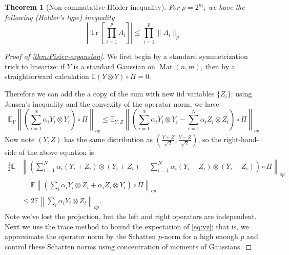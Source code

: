 \documentclass{article}
\newtheorem{theorem}{Theorem}
\newcommand{\ot}{\otimes}
\newcommand{\mat}{\operatorname{Mat}}
\newcommand{\E}{\mathbb{E}}
\newcommand\tr{\operatorname{Tr}}
\newcommand{\CF}[1]{{\color{purple}[CF: #1]}}
\begin{document}
\begin{theorem}[Non-commutative H\"older inequality]\label{thm:holder}
For $p = 2^{m}$, we have the following (Holder's type) inequality
\[ |\tr[\prod_{i=1}^{p} A_{i}]| \leq \prod_{i=1}^{p} \|A_{i}\|_{p}   \]
\end{theorem}



\begin{proof} [Proof of \cref{thm:Pisier-expansion}]
We first begin by a standard symmetrization trick to linearize: if $Y$ is a standard Gaussian on $\mat(n,m)$, then by a straightforward calculation $\E (Y \otimes Y)\circ \Pi = 0$.

Therefore we can add the a copy of the sum with new iid variables $\{Z_{i}\}$: using Jensen's inequality and the convexity of the operator norm, we have
\[ \E_{Y} \left\|\left(\sum_{i=1}^{N} \alpha_{i} Y_{i} \otimes Y_{i}\right) \circ \Pi\right\|_{op} \leq 
\E_{Y,Z} \left\|\left(\sum_{i=1}^{N} \alpha_{i} Y_{i} \otimes Y_{i}-\sum_{i=1}^{N} \alpha_{i} Z_{i} \otimes Z_{i}\right) \circ \Pi \right\|_{op}  \] Now note $(Y,Z)$ has the same distribution as $(\frac{Y+Z}{\sqrt{2}},\frac{Y-Z}{\sqrt{2}})$, so the right-hand-side of the above equation is
\begin{align}\frac{1}{2}\E &\left\|\left(\sum_{i=1}^{N} \alpha_{i} (Y_{i}+Z_{i}) \otimes (Y_{i}+Z_{i})  - \sum_{i=1}^{N} \alpha_{i} (Y_{i}-Z_{i}) \otimes (Y_{i}-Z_{i})\right)\circ \Pi \right\|_{op}\nonumber \\ 
& = \E \left\|\left(\sum_{i} \alpha_{i} Y_{i} \otimes Z_{i}  + \alpha_{i} Z_{i} \otimes Y_{i} \right) \circ \Pi \right\|_{op}  \nonumber\\
& \leq 2 \E \left\|\sum_{i} \alpha_{i} Y_{i} \otimes Z_{i}\right\|_{op}.   \label{eq:yz}
\end{align}
Note we've lost the projection, but the left and right operators are independent. Next we use the trace method to bound the expectation of \cref{eq:yz}; that is, we approximate the operator norm by the Schatten $p$-norm for a high enough $p$ and control these Schatten norms using concentration of moments of Gaussians.  


\end{proof}
\end{document}
